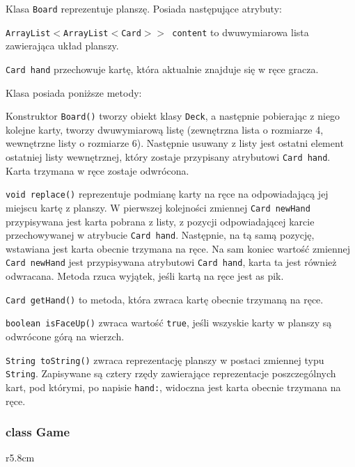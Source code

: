 \documentclass{article}
\begin{document}
Klasa \texttt{Board} reprezentuje planszę. Posiada następujące atrybuty:

\texttt{ArrayList$<$ArrayList$<$Card$>>$ content} to dwuwymiarowa lista zawierająca układ planszy.

\texttt{Card hand} przechowuje kartę, która aktualnie znajduje się w ręce gracza.

Klasa posiada poniższe metody:

Konstruktor \texttt{Board()} tworzy obiekt klasy \texttt{Deck}, a następnie pobierając z niego kolejne karty, tworzy dwuwymiarową listę (zewnętrzna lista o rozmiarze 4, wewnętrzne listy o rozmiarze 6). Następnie usuwany z listy jest ostatni element ostatniej listy wewnętrznej, który zostaje przypisany atrybutowi \texttt{Card hand}. Karta trzymana w ręce zostaje odwrócona.

\texttt{void replace()} reprezentuje podmianę karty na ręce na odpowiadającą jej miejscu kartę z planszy. W pierwszej kolejności zmiennej \texttt{Card newHand} przypisywana jest karta pobrana z listy, z pozycji odpowiadającej karcie przechowywanej w atrybucie \texttt{Card hand}. Następnie, na tą samą pozycję, wstawiana jest karta obecnie trzymana na ręce. Na sam koniec wartość zmiennej \texttt{Card newHand} jest przypisywana atrybutowi \texttt{Card hand}, karta ta jest również odwracana. Metoda rzuca wyjątek, jeśli kartą na ręce jest as pik.

\texttt{Card getHand()} to metoda, która zwraca kartę obecnie trzymaną na ręce.

\texttt{boolean isFaceUp()} zwraca wartość \texttt{true}, jeśli wszyskie karty w planszy są odwrócone górą na wierzch.

\texttt{String toString()} zwraca reprezentację planszy w postaci zmiennej typu \texttt{String}. Zapisywane są cztery rzędy zawierające reprezentacje poszczególnych kart, pod którymi, po napisie \texttt{hand:}, widoczna jest karta obecnie trzymana na ręce.

\subsubsection*{class Game}

\begin{wrapfigure}{r}{5.8cm}
\end{wrapfigure}
\end{document}
